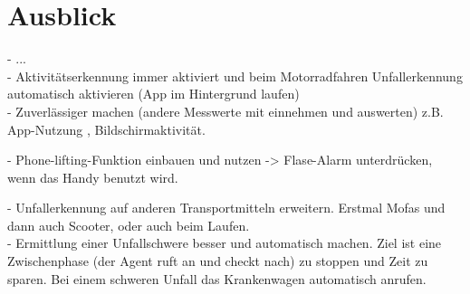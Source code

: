 \chapter{Ausblick}
- ...\\

- Aktivitätserkennung immer aktiviert und beim Motorradfahren Unfallerkennung automatisch aktivieren (App im Hintergrund laufen)\\

- Zuverlässiger machen (andere Messwerte mit einnehmen und auswerten) z.B. App-Nutzung , Bildschirmaktivität.

- Phone-lifting-Funktion einbauen und nutzen -> Flase-Alarm unterdrücken, wenn das Handy benutzt wird.

- Unfallerkennung auf anderen Transportmitteln erweitern. Erstmal Mofas und dann auch Scooter, oder auch beim Laufen.\\

- Ermittlung einer Unfallschwere besser und automatisch machen. Ziel ist eine Zwischenphase (der Agent ruft an und checkt nach) zu stoppen und Zeit zu sparen. Bei einem schweren Unfall das Krankenwagen automatisch anrufen.\\




